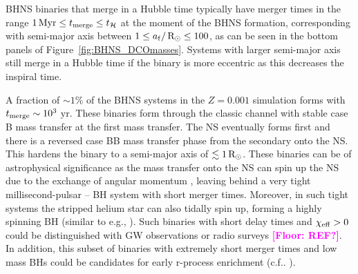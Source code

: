\documentclass[twocolumn]{aastex63}
\newcommand{\floor}[1]{\textbf{\textcolor{magenta}{[Floor: #1]}}}
\newcommand\bhnsSingle{BHNS\xspace}
\newcommand{\Zi}{\ensuremath{Z_{\rm{i}}}\xspace}
\newcommand{\Rsun}{\ensuremath{\,\rm{R}_{\odot}}\xspace}
\newcommand{\Myr}{\ensuremath{\,\mathrm{Myr}}\xspace}
\newcommand{\yrs}{\ensuremath{\,\mathrm{yr}}\xspace}
\newcommand{\thubble}{\ensuremath{{t}_{\mathcal{H}}}\xspace}
\newcommand{\af}{\ensuremath{a_{\rm{f}}}\xspace}
\begin{document}


 \bhnsSingle binaries that merge in a Hubble time typically have merger times in the range $1\Myr \leq t_{\rm{merge}} \leq \thubble$ at the moment of the \bhnsSingle formation, corresponding with semi-major axis between $1 \leq \af / \Rsun  \leq 100$,  as can be seen in the bottom panels of Figure~\ref{fig:BHNS_DCOmasses}. 
 Systems with larger semi-major axis still merge in a Hubble time if the binary is more eccentric as this decreases the inspiral time. 

A fraction of $\sim 1\%$ of the \bhnsSingle systems in the $Z=0.001$ simulation  forms with $t_{\rm{merge}} \sim  10^3\,$\yrs. 
These binaries form through the classic channel with stable case B mass transfer at the first mass transfer.
 The \ac{NS} eventually forms first and there is a reversed case BB mass transfer phase from the secondary onto the \ac{NS}. 
 This hardens the binary to a semi-major axis of  $\lesssim 1\Rsun$.
   These binaries can be of astrophysical significance as the mass transfer   onto the \ac{NS} can spin up the \ac{NS} due to the exchange of angular momentum \citet[e.g.,][]{1994MNRAS.269..455J,2008MNRAS.388..393K}, leaving behind a very tight millisecond-pulsar -- \ac{BH} system with short merger times. Moreover,  in such tight systems the stripped helium star can also tidally spin up, forming a highly spinning \ac{BH} (similar to e.g., \citealt{2016MNRAS.462..844K,2018MNRAS.473.4174Z,2020A&A...636A.104B,2018A&A...616A..28Q,2019arXiv190612257B}). Such binaries with  short delay times and $\chi_{\rm{eff}} >0$ could be distinguished with \ac{GW} observations  \citep{2018PhRvD..98d3002Z} or radio surveys \floor{REF?}.
    In addition, this subset of binaries with extremely short merger times and low mass \acp{BH} could be candidates for early r-process enrichment (c.f.. \citealt{2019ApJ...872..105S,2019arXiv191013436A, 2019ApJ...886....4Z}).



%
\end{document}
